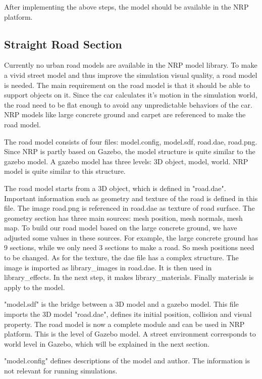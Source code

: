 After implementing the above steps, the model should be available in the NRP platform.

\subsection{Straight Road Section}

Currently no urban road models are available in the NRP model library. To make a vivid street model and thus improve the simulation visual quality, a road model is needed. The main requirement on the road model is that it should be able to support objects on it. Since the car calculates it's motion in the simulation world, the road need to be flat enough to avoid any unpredictable behaviors of the car. NRP models like large concrete ground and carpet are referenced to make the road model.


The road model consists of four files: model.config, model.sdf, road.dae, road.png. Since NRP is partly based on Gazebo, the model structure is quite similar to the gazebo model. A gazebo model has three levels: 3D object, model, world. NRP model is quite similar to this structure. 


The road model starts from a 3D object, which is defined in "road.dae". Important information such as geometry and texture of the road is defined in this file. The image road.png is referenced in road.dae as texture of road surface. The geometry section has three main sources: mesh position, mesh normals, mesh map. To build our road model based on the large concrete ground, we have adjusted some values in these sources. For example, the large concrete ground has 9 sections, while we only need 3 sections to make a road. So mesh positions need to be changed. As for the texture, the dae file has a complex structure. The image is imported as library\_images in road.dae. It is then used in library\_effects. In the next step, it makes library\_materials. Finally materials is apply to the model. 


"model.sdf" is the bridge between a 3D model and a gazebo model. This file imports the 3D model "road.dae", defines its initial position, collision and visual property. The road model is now a complete module and can be used in NRP platform. This is the level of Gazebo model. A street environment corresponds to world level in Gazebo, which will be explained in the next section.

"model.config" defines descriptions of the model and author. The information is not relevant for running simulations. 

